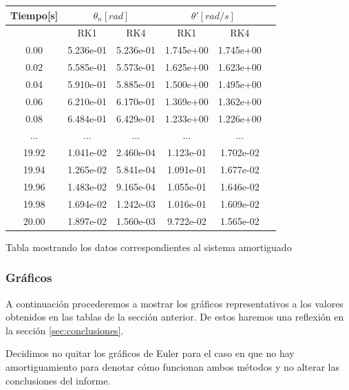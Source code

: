 \documentclass[titlepage,a4paper]{article}
\begin{document}
    \begin{center}
        \begin{tabular}{| c | c | c | c | c | c|}
            \hline
           Tiempo[s] &\multicolumn{2}{|c|}{$\theta_n[rad]$} &\multicolumn{2}{|c|}{$\theta'[rad/s]$} \tabularnewline
            \hline
            & RK1 & RK4 & RK1 & RK4 \\
            \hline
            0.00 & 5.236e-01 & 5.236e-01 & 1.745e+00 & 1.745e+00\\
            0.02 & 5.585e-01 & 5.573e-01 & 1.625e+00 & 1.623e+00\\
            0.04 & 5.910e-01 & 5.885e-01 & 1.500e+00 & 1.495e+00\\
            0.06 & 6.210e-01 & 6.170e-01 & 1.369e+00 & 1.362e+00\\
            0.08 & 6.484e-01 & 6.429e-01 & 1.233e+00 & 1.226e+00\\
            ...&...&...&...&...\\
            19.92 & 1.041e-02 & 2.460e-04 & 1.123e-01 & 1.702e-02\\
            19.94 & 1.265e-02 & 5.841e-04 & 1.091e-01 & 1.677e-02\\
            19.96 & 1.483e-02 & 9.165e-04 & 1.055e-01 & 1.646e-02\\
            19.98 & 1.694e-02 & 1.242e-03 & 1.016e-01 & 1.609e-02\\
            20.00 & 1.897e-02 & 1.560e-03 & 9.722e-02 & 1.565e-02\\
            \hline
        \end{tabular}
        
        \smallskip
        Tabla mostrando los datos correspondientes al sistema amortiguado
    \end{center}
    
    \newpage
    
    \subsubsection{Gráficos}
    A continuación procederemos a mostrar los gráficos representativos a los valores obtenidos en las tablas de la sección anterior. De estos haremos una reflexión en la sección \ref{sec:conclusiones}.
    
    Decidimos no quitar los gráficos de Euler para el caso en que no hay amortiguamiento para denotar cómo funcionan ambos métodos y no alterar las conclusiones del informe.
    
\end{document}
